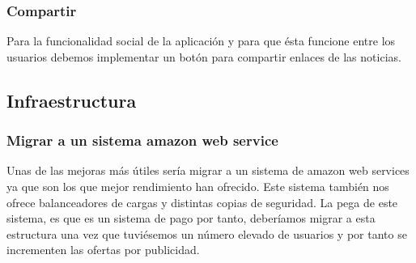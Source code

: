 \subsubsection{Compartir}
Para la funcionalidad social de la aplicación y para que ésta funcione entre los usuarios debemos implementar un botón para compartir enlaces de las noticias.

\subsection{Infraestructura}

\subsubsection{Migrar a un sistema amazon web service}

Unas de las mejoras más útiles sería migrar a un sistema de amazon web services ya que son los que mejor rendimiento han ofrecido. Este sistema también nos ofrece balanceadores de cargas y distintas copias de seguridad. La pega de este sistema, es que es un sistema de pago por tanto, deberíamos migrar a esta estructura una vez que tuviésemos un número elevado de usuarios y por tanto se incrementen las ofertas por publicidad.

